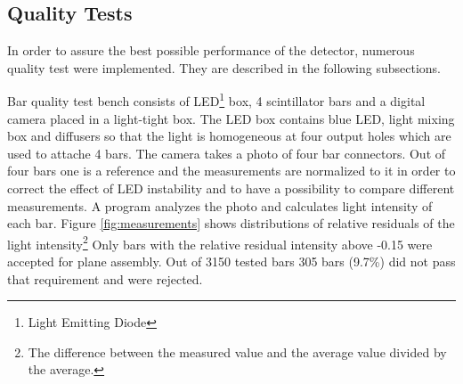 \documentclass[a4paper,11pt]{article}
\begin{document}
\subsection{Quality Tests}\label{construction:subsec:quality_tests}

In order to assure the best possible performance of the detector, numerous quality test were implemented. They are described in the following subsections.


Bar quality test bench consists of LED\footnote{Light Emitting Diode} box, 4 scintillator bars and a digital camera placed in a light-tight box.
The LED box contains blue LED, light mixing box and diffusers so that the light is homogeneous at four output holes which are used to attache
4 bars. The camera takes a photo of four bar connectors. Out of four bars one is a reference and the measurements are normalized to it in order to correct the effect
of LED instability and to have a possibility to compare different measurements. A program analyzes the photo and calculates light intensity of each bar. Figure
\ref{fig:measurements} shows distributions of relative residuals of the light intensity\footnote{The difference between the measured value and the average value divided
by the average.} Only bars with the relative residual intensity above -0.15 were accepted for plane assembly. Out of 3150 tested bars 305 bars (9.7\%) did not pass that
requirement and were rejected.
\end{document}

